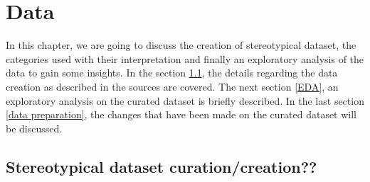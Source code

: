 \chapter{Data}

In this chapter, we are going to discuss the creation of stereotypical dataset, the categories used with their interpretation and finally an exploratory analysis of the data to gain some insights. In the section \ref{stereotypical dataset}, the details regarding the data creation as described in the sources are covered. The next section \ref{EDA}, an exploratory analysis on the curated dataset is briefly described. In the last section \ref{data preparation}, the changes that have been made on the curated dataset will be discussed.

\section{Stereotypical dataset curation/creation??}\label{stereotypical dataset}
